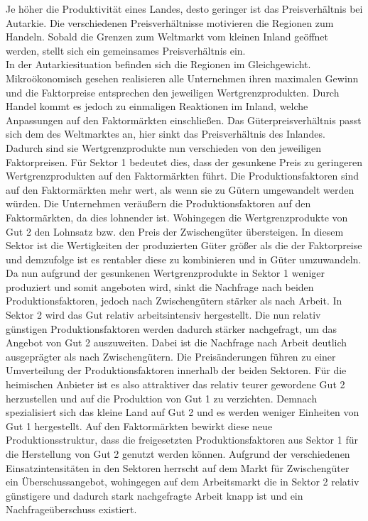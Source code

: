 Je höher die Produktivität eines Landes, desto geringer ist das Preisverhältnis bei Autarkie. Die verschiedenen Preisverhältnisse motivieren die Regionen zum Handeln. Sobald die Grenzen zum Weltmarkt vom kleinen Inland geöffnet werden, stellt sich ein gemeinsames  Preisverhältnis ein.\\
In der Autarkiesituation befinden sich die Regionen im Gleichgewicht. Mikroökonomisch gesehen realisieren alle Unternehmen ihren maximalen Gewinn und die Faktorpreise  entsprechen den jeweiligen Wertgrenzprodukten. Durch Handel kommt es jedoch zu einmaligen Reaktionen im Inland, welche Anpassungen auf den Faktormärkten einschließen. Das Güterpreisverhältnis passt sich dem des Weltmarktes an, hier sinkt das Preisverhältnis des Inlandes. Dadurch sind sie Wertgrenzprodukte nun verschieden von den jeweiligen Faktorpreisen. Für Sektor 1 bedeutet dies, dass der gesunkene Preis zu geringeren Wertgrenzprodukten auf den Faktormärkten führt. Die Produktionsfaktoren sind auf den Faktormärkten mehr wert, als wenn sie zu Gütern umgewandelt werden würden. Die Unternehmen veräußern die Produktionsfaktoren auf den Faktormärkten, da dies lohnender ist. Wohingegen die Wertgrenzprodukte von Gut 2 den Lohnsatz bzw. den Preis der Zwischengüter übersteigen. In diesem Sektor ist die Wertigkeiten der produzierten Güter größer als die der Faktorpreise und demzufolge ist es rentabler diese zu kombinieren und in Güter umzuwandeln. Da nun aufgrund der gesunkenen Wertgrenzprodukte in Sektor 1 weniger produziert und somit angeboten wird, sinkt die Nachfrage nach beiden Produktionsfaktoren, jedoch nach Zwischengütern stärker als nach Arbeit. In Sektor 2 wird das Gut relativ arbeitsintensiv hergestellt. Die nun relativ günstigen Produktionsfaktoren werden dadurch stärker nachgefragt, um das Angebot von Gut 2 auszuweiten. Dabei ist die Nachfrage nach Arbeit deutlich ausgeprägter als nach Zwischengütern. Die Preisänderungen führen zu einer Umverteilung der Produktionsfaktoren innerhalb der beiden Sektoren. Für die heimischen Anbieter ist es also attraktiver das relativ teurer gewordene Gut 2 herzustellen und auf die Produktion von Gut 1 zu verzichten. Demnach spezialisiert sich das kleine Land auf Gut 2 und es werden weniger Einheiten von Gut 1 hergestellt. Auf den Faktormärkten bewirkt diese neue Produktionsstruktur, dass die freigesetzten Produktionsfaktoren aus Sektor 1 für die Herstellung von Gut 2 genutzt werden können. Aufgrund der verschiedenen Einsatzintensitäten in den Sektoren herrscht auf dem Markt für Zwischengüter ein Überschussangebot, wohingegen auf dem Arbeitsmarkt die in Sektor 2 relativ günstigere und dadurch stark nachgefragte Arbeit knapp ist und ein Nachfrageüberschuss existiert.\\


